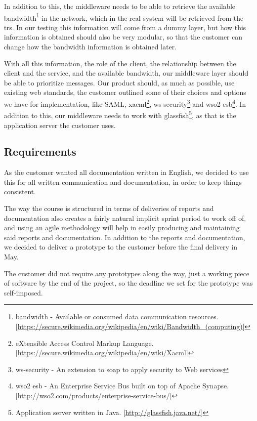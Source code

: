     In addition to this, the middleware needs to be able to retrieve the available \gls{bandwidth}\footnote{\Gls{bandwidth} - Available or consumed data communication resources.[\url{https://secure.wikimedia.org/wikipedia/en/wiki/Bandwidth_(computing)}]} in the network, which in the real system will be retrieved from the \glspl{tr}. In our testing this information will come from a dummy layer, but how this information is obtained should also be very modular, so that the customer can change how the bandwidth information is obtained later.

    With all this information, the role of the client, the relationship between the client and the service, and the available bandwidth, our middleware layer should be able to prioritize messages. Our product should, as much as possible, use existing web standards, the customer outlined some of their choices and options we have for implementation, like SAML, \gls{xacml}\footnote{eXtensible Access Control Markup Language. [\url{https://secure.wikimedia.org/wikipedia/en/wiki/Xacml}]}, \gls{ws-security}\footnote{\gls{ws-security} - An extension to \gls{soap} to apply security to Web services} and \gls{wso2 esb}\footnote{\gls{wso2 esb} - An Enterprise Service Bus built on top of Apache Synapse. [\url{http://wso2.com/products/enterprise-service-bus/}]}. In addition to this, our middleware needs to work with \gls{glassfish}\footnote{Application server written in Java. [\url{http://glassfish.java.net/}]}, as that is the application server the customer uses.
   
    \subsection{Requirements}\label{Requirements}
    As the customer wanted all documentation written in English, we decided to use this for all written communication and documentation, in order to keep things consistent.
    
    The way the course is structured in terms of deliveries of reports and documentation also creates a fairly natural implicit sprint period to work off of, and using an agile methodology will help in easily producing and maintaining said reports and documentation. In addition to the  reports and documentation, we decided to deliver a prototype to the customer before the final delivery in May.

    The customer did not require any prototypes along the way, just a working piece of software by the end of the project, so the deadline we set for the prototype was self-imposed. 

